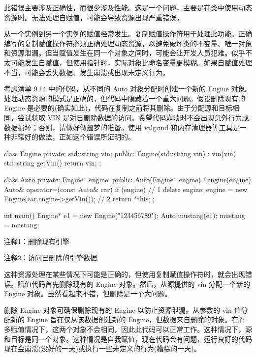 此错误主要涉及正确性，而很少涉及性能。这是一个问题，主要是在类中使用动态资源时。无法处理自赋值，可能会导致资源出现严重错误。

从一个实例到另一个实例的赋值经常发生。复制赋值操作符用于处理此功能。正确编写的复制赋值操作符必须正确处理动态资源，以避免破坏类的不变量、唯一对象和资源泄漏。但当赋值发生在同一个对象之间时，可能会让开发人员犯难。似乎不太可能发生自赋值，但使用指针时，实际对象比命名变量更模糊。如果自赋值处理不当，可能会丢失数据、发生崩溃或出现未定义行为。


考虑清单 9.14 中的代码，从不同的 Auto 对象分配时创建一个新的 Engine 对象。处理动态资源的模式是正确的，但代码中隐藏着一个重大问题。假设删除现有的 Engine 是必要的(确实如此)，代码在复制之前将其删除。由于分配源和目标相同，尝试获取 VIN 是对已删除数据的访问。希望代码崩溃时不会出现意外行为或数据损坏；否则，请做好做噩梦的准备。使用 valgrind 和内存清理器等工具是一种非常好的做法，正如这个错误所证明的。


\begin{cpp}
class Engine {
private:
  std::string vin;
public:
  Engine(std::string vin) : vin(vin) {}
  std::string getVin() { return vin; }
};

class Auto {
private:
  Engine* engine;
public:
  Auto(Engine* engine) : engine(engine) {}
  Auto& operator=(const Auto& car) {
    if (engine) // 1
      delete engine;
    engine = new Engine(car.engine->getVin()); // 2
    return *this;
  }
};

int main() {
  Engine* e1 = new Engine("123456789");
  Auto mustang(e1);
  mustang = mustang;
}
\end{cpp}

{\footnotesize
注释1：删除现有引擎

注释2：访问已删除的引擎数据
}


这种资源处理在某些情况下可能是正确的，但使用复制赋值操作符时，就会出现错误。赋值代码首先删除现有的 Engine 对象。然后，从源提供的 vin 分配一个新的 Engine 对象。虽然看起来不错，但删除是一个大问题。

删除 Engine 对象可确保删除现有的 Engine 以防止资源泄漏。从参数的 vin 值分配新的 Engine 旨在仅从该数据创建新的 Engine，但数据来自删除的对象。在许多赋值情况下，这两个对象不会相同，因此此代码可以正常工作。这种情况下，源和目标是同一个对象。这种情况是自我赋值，现在代码会有问题，运行良好的代码现在会崩溃(没好的一天)或执行一些未定义的行为(糟糕的一天)。

